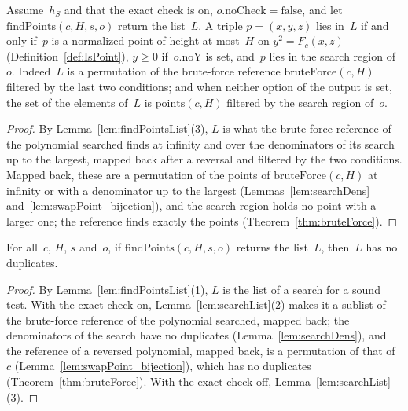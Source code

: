 \begin{theorem}[Membership]\label{thm:membership}
  \leanok
  Assume~$h_S$ and that the exact check is on, $o.\mathrm{noCheck} = \mathrm{false}$, and let
  $\mathrm{findPoints}(c, H, s, o)$ return the list~$L$. A triple $p = (x, y, z)$ lies in~$L$ if and
  only if~$p$ is a normalized point of height at most~$H$ on $y^2 = F_c(x, z)$
  (Definition~\ref{def:IsPoint}), $y \ge 0$ if~$o.\mathrm{noY}$ is set, and~$p$ lies in the search
  region of~$o$. Indeed~$L$ is a permutation of the brute-force reference
  $\mathrm{bruteForce}(c, H)$ filtered by the last two conditions; and when neither option of the
  output is set, the set of the elements of~$L$ is $\mathrm{points}(c, H)$ filtered by the search
  region of~$o$.
\end{theorem}

\begin{proof}
  \leanok
  By Lemma~\ref{lem:findPointsList}(3), $L$ is what the brute-force reference of the polynomial
  searched finds at infinity and over the denominators of its search up to the largest, mapped back
  after a reversal and filtered by the two conditions. Mapped back, these are a permutation of the
  points of $\mathrm{bruteForce}(c, H)$ at infinity or with a denominator up to the largest
  (Lemmas~\ref{lem:searchDens} and~\ref{lem:swapPoint_bijection}), and the search region holds no
  point with a larger one; the reference finds exactly the points (Theorem~\ref{thm:bruteForce}).
\end{proof}

\begin{theorem}[No duplicates]\label{thm:nodup}
  \leanok
  For all~$c$, $H$, $s$ and~$o$, if $\mathrm{findPoints}(c, H, s, o)$ returns the list~$L$, then~$L$
  has no duplicates.
\end{theorem}

\begin{proof}
  \leanok
  By Lemma~\ref{lem:findPointsList}(1), $L$ is the list of a search for a sound test. With the exact
  check on, Lemma~\ref{lem:searchList}(2) makes it a sublist of the brute-force reference of the
  polynomial searched, mapped back; the denominators of the search have no duplicates
  (Lemma~\ref{lem:searchDens}), and the reference of a reversed polynomial, mapped back, is a
  permutation of that of~$c$ (Lemma~\ref{lem:swapPoint_bijection}), which has no duplicates
  (Theorem~\ref{thm:bruteForce}). With the exact check off, Lemma~\ref{lem:searchList}(3).
\end{proof}

